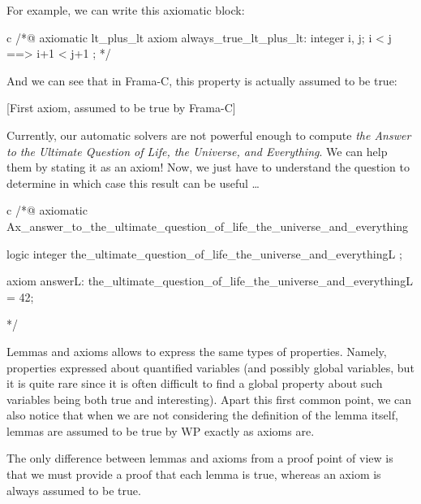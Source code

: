\documentclass[middle]{zmdocument}
\begin{document}
For example, we can write this axiomatic block:



\begin{CodeBlock}{c}
/*@
  axiomatic lt_plus_lt{
    axiom always_true_lt_plus_lt:
      \forall integer i, j; i < j ==> i+1 < j+1 ;
  }
*/
\end{CodeBlock}



And we can see that in Frama-C, this property is actually assumed to be
true:



[First axiom, assumed to be true by Frama-C]


\begin{Spoiler}
  Currently, our automatic solvers are not
  powerful enough to compute \emph{the Answer to the Ultimate
    Question of Life, the Universe, and Everything}. We can help
  them by stating it as an axiom! Now, we just have to 
  understand the question to determine in which case this result can be
  useful \ldots{}

\begin{CodeBlock}{c}
/*@
  axiomatic Ax_answer_to_the_ultimate_question_of_life_the_universe_and_everything {
    logic integer the_ultimate_question_of_life_the_universe_and_everything{L} ;

    axiom answer{L}:
      the_ultimate_question_of_life_the_universe_and_everything{L} = 42;
  }
*/
\end{CodeBlock}
\end{Spoiler}





Lemmas and axioms allows to express the same types of properties.
Namely, properties expressed about quantified variables (and possibly
global variables, but it is quite rare since it is often difficult to
find a global property about such variables being both true and
interesting). Apart this first common point, we can also notice that
when we are not considering the definition of the lemma itself, lemmas
are assumed to be true by WP exactly as axioms are.




The only difference between lemmas and axioms from a proof point of view
is that we must provide a proof that each lemma is true, whereas an
axiom is always assumed to be true.



\end{document}
